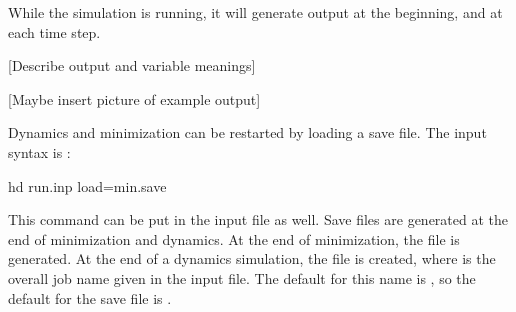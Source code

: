 While the simulation is running, it will generate output at the beginning, and at each time step. 

[Describe output and variable meanings]

[Maybe insert picture of example output]



Dynamics and minimization can be restarted by loading a save file.
The input syntax is :
\begin{command}
hd run.inp load=min.save
\end{command}
This command can be put in the input file as well.
Save files are generated at the end of minimization and dynamics.
At the end of minimization, the file  is generated.
At the end of a dynamics simulation, the file  is created, where  is the overall job name given in the input file.
The default for this name is , so the default for the save file is .




